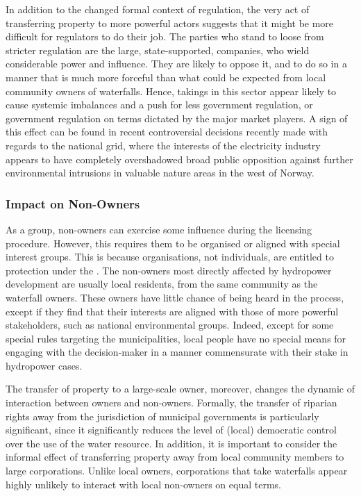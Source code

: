In addition to the changed formal context of regulation, the very act of transferring property to more powerful actors suggests that it might be more difficult for regulators to do their job. The parties who stand to loose from stricter regulation are the large, state-supported, companies, who wield considerable power and influence. They are likely to oppose it, and to do so in a manner that is much more forceful than what could be expected from local community owners of waterfalls. Hence, takings in this sector appear likely to cause systemic imbalances and a push for less government regulation, or government regulation on terms dictated by the major market players. A sign of this effect can be found in recent controversial decisions recently made with regards to the national grid, where the interests of the electricity industry appears to have completely overshadowed broad public opposition against further environmental intrusions in valuable nature areas in the west of Norway.

\subsubsection{Impact on Non-Owners}

As a group, non-owners can exercise some influence during the licensing procedure. However, this requires them to be organised or aligned with special interest groups. This is because organisations, not individuals, are entitled to protection under the \cite{wra17}. The non-owners most directly affected by hydropower development are usually local residents, from the same community as the waterfall owners. These owners have little chance of being heard in the process, except if they find that their interests are aligned with those of more powerful stakeholders, such as national environmental groups. Indeed, except for some special rules targeting the municipalities, local people have no special means for engaging with the decision-maker in a manner commensurate with their stake in hydropower cases.

The transfer of property to a large-scale owner, moreover, changes the dynamic of interaction between owners and non-owners. Formally, the transfer of riparian rights away from the jurisdiction of municipal governments is particularly significant, since it significantly reduces the level of (local) democratic control over the use of the water resource. In addition, it is important to consider the informal effect of transferring property away from local community members to large corporations. Unlike local owners, corporations that take waterfalls appear highly unlikely to interact with local non-owners on equal terms. %


